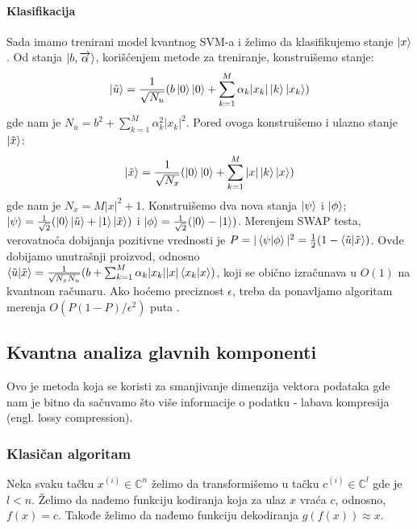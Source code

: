 \documentclass[12pt, letterpaper, oneside]{article}
\begin{document}
\paragraph*{Klasifikacija}
Sada imamo trenirani model kvantnog SVM-a i želimo da klasifikujemo stanje $\Ket{x}$. Od stanja $\Ket{b,\overrightarrow{\alpha}}$, korišćenjem metode za treniranje, konstruišemo stanje:
\[
    \Ket{\tilde{u}} = \frac{1}{\sqrt{N_u}}(b\Ket{0}\Ket{0} + \sum_{k=1}^M{\alpha_k |x_k| \Ket{k}\Ket{x_k}})
\]
gde nam je $N_u=b^2+\sum_{k=1}^M{\alpha_k^2 |x_k|^2}$. Pored ovoga konstruišemo i ulazno stanje $\Ket{\tilde{x}}$:
\[
    \Ket{\tilde{x}} = \frac{1}{\sqrt{N_x}}(\Ket{0}\Ket{0} + \sum_{k=1}^M{|x|\Ket{k}\Ket{x}})
\]
gde nam je $N_x=M|x|^2 + 1$. Konstruišemo dva nova stanja $\Ket{\psi}$ i $\Ket{\phi}$; $\Ket{\psi}=\frac{1}{\sqrt{2}}(\Ket{0}\Ket{\tilde{u}}+\Ket{1}\Ket{\tilde{x}})$ i
$\Ket{\phi} = \frac{1}{\sqrt{2}}(\Ket{0}-\Ket{1})$. Merenjem SWAP testa, verovatnoća dobijanja pozitivne vrednosti je $P=|\braket{\psi|\phi}|^2=\frac{1}{2}(1-\braket{\tilde{u}|\tilde{x}})$. 
Ovde dobijamo unutrašnji proizvod, odnosno $\braket{\tilde{u}|\tilde{x}} = \frac{1}{\sqrt{N_xN_u}}(b+\sum_{k=1}^M{\alpha_k |x_k||x|\braket{x_k|x}})$, koji se obično izračunava u $O(1)$ na kvantnom računaru.
Ako hoćemo preciznost $\epsilon$, treba da ponavljamo algoritam merenja $O(P(1-P)/\epsilon^2)$ puta \cite{rebentrost2014quantum}.

\subsection{Kvantna analiza glavnih komponenti}
Ovo je metoda koja se koristi za smanjivanje dimenzija vektora podataka gde nam je bitno da sačuvamo što više informacije o podatku - labava kompresija (engl. lossy compression). 
\subsubsection{Klasičan algoritam}
Neka svaku tačku $x^{(i)} \in \mathbb{C}^n$ želimo da transformišemo u tačku $c^{(i)} \in \mathbb{C}^l$ gde je $l < n$.
Želimo da nađemo funkciju kodiranja koja za ulaz $x$ vraća $c$, odnosno, $f(x)=c$. Takođe želimo da nađemo funkciju dekodiranja $g(f(x)) \approx x$.
\end{document}
